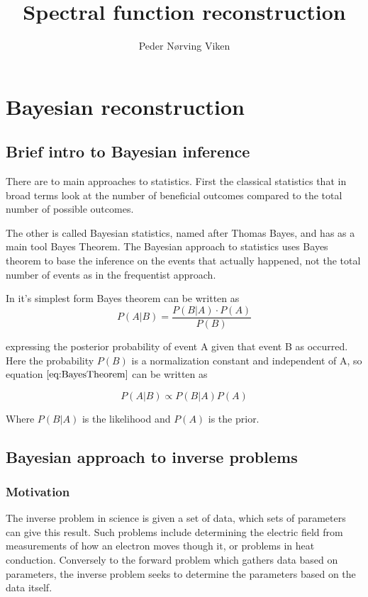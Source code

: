 \documentclass[a4paper, oneside, 12pt]{book}
\author{Peder Nørving Viken} %
\title{Spectral function reconstruction} %
\begin{document}
\maketitle

\tableofcontents


\chapter{Bayesian reconstruction}
\section{Brief intro to Bayesian inference}

There are to main approaches to statistics. First the classical statistics that in broad terms look at the number of beneficial outcomes compared to the total number of possible outcomes. 

The other is called Bayesian statistics, named after Thomas Bayes, and has as a main tool Bayes Theorem. The Bayesian approach to statistics uses Bayes theorem to base the inference on the events that actually happened, not the total number of events as in the frequentist approach.

In it's simplest form Bayes theorem can be written as 
\begin{equation}
\label{eq:BayesTheorem}
P(A|B)=\frac{P(B|A)\cdot P(A)}{P(B)}
\end{equation}

expressing the posterior probability of event A given that event B as occurred. Here the probability $P(B)$ is a normalization constant and independent of A, so equation $\ref{eq:BayesTheorem}$ can be written as

\begin{equation}
P(A|B) \propto P(B|A)P(A)
\end{equation}

Where $P(B|A)$ is the likelihood and $P(A)$ is the prior.
\section{Bayesian approach to inverse problems}

\subsection{Motivation}
The inverse problem in science is given a set of data, which sets of parameters can give this result. Such problems include determining the electric field from measurements of how an electron moves though it, or problems in heat conduction. Conversely to the forward problem which gathers data based on parameters, the inverse problem seeks to determine the parameters based on the data itself.
\end{document}

